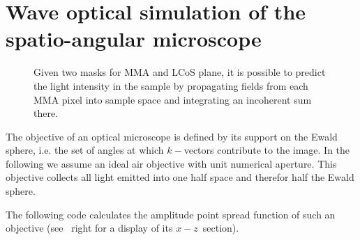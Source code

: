 \chapter{Wave optical simulation of the spatio-angular microscope}
\label{sec:sim-angle}

\begin{figure}[!hbt]
  \centering
  \def\svgscale{1.5}
  
  \caption{Given two masks for MMA and LCoS plane, it is possible to
    predict the light intensity in the sample by propagating fields
    from each MMA pixel into sample space and integrating an
    incoherent sum there.}
  \label{fig:memi-simple-app}
\end{figure}

The objective of an optical microscope is defined by its support on
the Ewald sphere, i.e. the set of angles at which $k-$vectors
contribute to the image. In the following we assume an ideal air
objective with unit numerical aperture. This objective collects all
light emitted into one half space and therefor half the Ewald sphere.

The following code calculates the amplitude point spread function of
such an objective (see ~right for a display of its
$x-z$~section).

